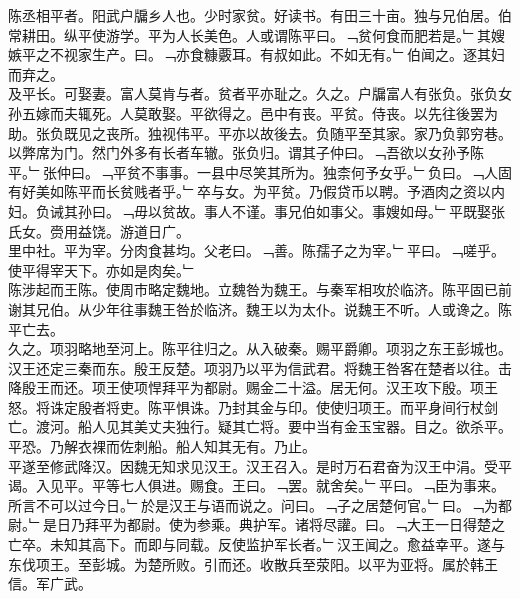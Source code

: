 \documentclass{zhvt-classic}
\begin{document}

\hspace*{2em}陈丞相平者。阳武户牖乡人也。少时家贫。好读书。有田三十亩。独与兄伯居。伯常耕田。纵平使游学。平为人长美色。人或谓陈平曰。﹁贫何食而肥若是。﹂其嫂嫉平之不视家生产。曰。﹁亦食糠覈耳。有叔如此。不如无有。﹂伯闻之。逐其妇而弃之。\\
\hspace*{2em}及平长。可娶妻。富人莫肯与者。贫者平亦耻之。久之。户牖富人有张负。张负女孙五嫁而夫辄死。人莫敢娶。平欲得之。邑中有丧。平贫。侍丧。以先往後罢为助。张负既见之丧所。独视伟平。平亦以故後去。负随平至其家。家乃负郭穷巷。以弊席为门。然门外多有长者车辙。张负归。谓其子仲曰。﹁吾欲以女孙予陈平。﹂张仲曰。﹁平贫不事事。一县中尽笑其所为。独柰何予女乎。﹂负曰。﹁人固有好美如陈平而长贫贱者乎。﹂卒与女。为平贫。乃假贷币以聘。予酒肉之资以内妇。负诫其孙曰。﹁毋以贫故。事人不谨。事兄伯如事父。事嫂如母。﹂平既娶张氏女。赍用益饶。游道日广。\\
\hspace*{2em}里中社。平为宰。分肉食甚均。父老曰。﹁善。陈孺子之为宰。﹂平曰。﹁嗟乎。使平得宰天下。亦如是肉矣。﹂\\
\hspace*{2em}陈涉起而王陈。使周市略定魏地。立魏咎为魏王。与秦军相攻於临济。陈平固已前谢其兄伯。从少年往事魏王咎於临济。魏王以为太仆。说魏王不听。人或谗之。陈平亡去。\\
\hspace*{2em}久之。项羽略地至河上。陈平往归之。从入破秦。赐平爵卿。项羽之东王彭城也。汉王还定三秦而东。殷王反楚。项羽乃以平为信武君。将魏王咎客在楚者以往。击降殷王而还。项王使项悍拜平为都尉。赐金二十溢。居无何。汉王攻下殷。项王怒。将诛定殷者将吏。陈平惧诛。乃封其金与印。使使归项王。而平身间行杖剑亡。渡河。船人见其美丈夫独行。疑其亡将。要中当有金玉宝器。目之。欲杀平。平恐。乃解衣裸而佐刺船。船人知其无有。乃止。\\
\hspace*{2em}平遂至修武降汉。因魏无知求见汉王。汉王召入。是时万石君奋为汉王中涓。受平谒。入见平。平等七人俱进。赐食。王曰。﹁罢。就舍矣。﹂平曰。﹁臣为事来。所言不可以过今日。﹂於是汉王与语而说之。问曰。﹁子之居楚何官。﹂曰。﹁为都尉。﹂是日乃拜平为都尉。使为参乘。典护军。诸将尽讙。曰。﹁大王一日得楚之亡卒。未知其高下。而即与同载。反使监护军长者。﹂汉王闻之。愈益幸平。遂与东伐项王。至彭城。为楚所败。引而还。收散兵至荥阳。以平为亚将。属於韩王信。军广武。\\
\end{document}
